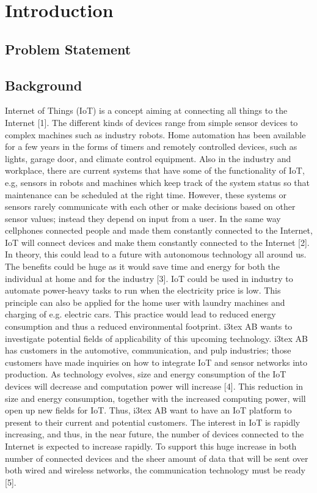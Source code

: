 \section{Introduction \cite{bregell_hardware_2015}}

\subsection{Problem Statement}


\subsection{Background}

Internet of Things (IoT) is a concept aiming at connecting all things to the Internet [1].
The different kinds of devices range from simple sensor devices to complex machines such as industry robots.
Home automation has been available for a few years in the forms of timers and remotely controlled devices,
	such as lights,
	garage door,
	and climate control equipment.
Also in the industry and workplace,
	there are current systems that have some of the functionality of IoT,
	e.g,
	sensors in robots and machines which keep track of the system status so that maintenance can be scheduled at the right time.
However,
	these systems or sensors rarely communicate with each other or make decisions based on other sensor values;
	instead they depend on input from a user.
In the same way cellphones connected people and made them constantly connected to the Internet,
	IoT will connect devices and make them constantly connected to the Internet [2].
In theory,
	this could lead to a future with autonomous technology all around us.
The benefits could be huge as it would save time and energy for both the individual at home and for the industry [3].
IoT could be used in industry to automate power-heavy tasks to run when the electricity price is low.
This principle can also be applied for the home user with laundry machines and charging of e.g.
electric cars.
This practice would lead to reduced energy consumption and thus a reduced environmental footprint.
i3tex AB wants to investigate potential fields of applicability of this upcoming technology.
i3tex AB has customers in the automotive,
	communication,
	and pulp industries;
	those customers have made inquiries on how to integrate IoT and sensor networks into production.
As technology evolves,
	size and energy consumption of the IoT devices will decrease and computation power will increase [4].
This reduction in size and energy consumption,
	together with the increased computing power,
	will open up new fields for IoT.
Thus,
	i3tex AB want to have an IoT platform to present to their current and potential customers.
The interest in IoT is rapidly increasing,
	and thus,
	in the near future,
	the number of devices connected to the Internet is expected to increase rapidly.
To support this huge increase in both number of connected devices and the sheer amount of data that will be sent over both wired and wireless networks,
	the communication technology must be ready [5].
	
